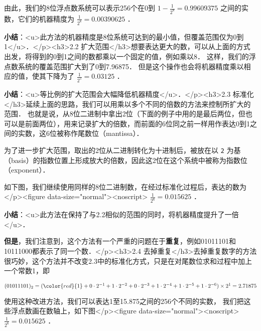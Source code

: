 由此，我们的8位浮点数系统可以表示256个在0到  $1-\frac{1}{2^8}=0.99609375$  之间的实数，它们的机器精度为  $\frac{1}{2^8}=0.00390625$  ．

\textbf{小结}：<u>此方法的机器精度是8位系统可达到的最小值，但覆盖范围仅为0到1</u>．</p><h3>2.2 扩大范围</h3>想要表达更大的数，可以从上面的方式出发，将得到的0到1之间的数都乘以一个固定的值，例如乘以8． 这样，我们的浮点数系统的覆盖范围扩大到了0到7.96875． 但是这个操作也会将机器精度乘以相应的值，使其下降为了  $\frac{1}{2^5}=0.03125$  ．

\textbf{小结}：<u>等比例的扩大范围会大幅降低机器精度</u>．</p><h3>2.3 标准化</h3>延续上面的思路，我们可以用乘以多个不同的倍数的方法来控制所扩大的范围． 也就是说，从8位二进制中拿出2位（下面的例子中用的是最后两位，但也可以是前面两位），用来记录扩大的倍数，而前面的6位同之前一样用作表达0到1之间的实数，这6位被称作尾数位（mantissa）． 

为了进一步扩大范围，取出的2位从二进制转化为十进制后，被放在以 \verb|2| 为基（basis）的指数位置上形成放大的倍数，因此这2位在这个系统中被称为指数位（exponent）．

如下图，我们继续使用同样的8位二进制数，在经过标准化过程后，表达的数为</p><figure data-size="normal"><noscript> $\frac{1}{2^6}=0.015625$  ．

\textbf{小结}：<u>此方法在保持了与2.2相似的范围的同时，将机器精度提升了一倍</u>．

\textbf{但是}，我们注意到，这个方法有一个严重的问题在于\textbf{重复}，例如01011101和10111000都表示了同一个数．</p><h3>2.4 去掉重复</h3>去掉重复数字的方法很巧妙，这个方法并不改变2.3中的标准化方式，只是在对尾数位求和过程中加上一个常数1，即

 $(01011101)_2=({\color{red}{1}}+0\cdot2^{-1}+1\cdot2^{-2}+0\cdot2^{-3}+1\cdot2^{-4}+1\cdot2^{-5}+1\cdot2^{-6})\times2^1=2.71875\\$  

使用这种改进方法，我们可以表达1至15.875之间的256个不同的实数， 我们把这些浮点数画在数轴上，如下图</p><figure data-size="normal"><noscript> $\frac{1}{2^6}=0.015625$  ．

